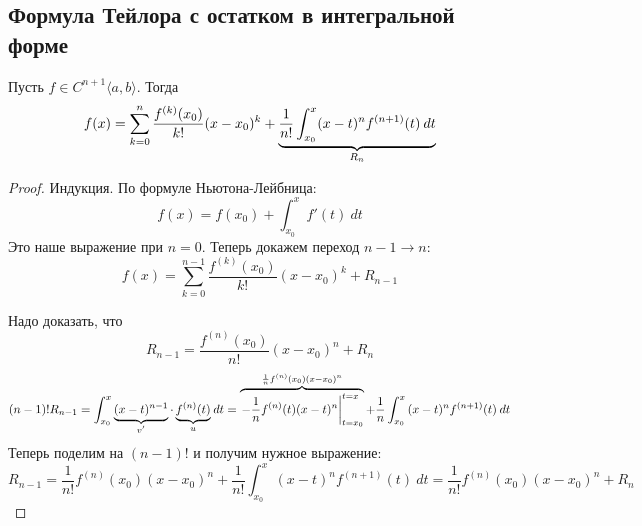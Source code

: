 \subsection{Формула Тейлора с остатком в интегральной форме}

\begin{theorem}
    Пусть $f \in C^{n + 1}\langle a, b \rangle$. Тогда
    \begin{equation*}
    f(x) =
    \sum_{k = 0}^{n} \frac{f^{(k)}(x_0)}{k!}(x - x_0)^k +
    \underbrace{\frac{1}{n!}\int_{x_0}^{x} (x - t)^n f^{(n + 1)}(t) \: dt}_{\mathclap{R_n}}
    \end{equation*}
\end{theorem}
\begin{proof}
    Индукция. По формуле Ньютона-Лейбница:
    \begin{equation*}
      f(x) = f(x_0) + \int_{x_0}^{x} f'(t) \: dt
    \end{equation*}
    Это наше выражение при $n = 0$. Теперь докажем переход $n - 1 \to n$:
    \begin{equation*}
      f(x) = \sum_{k = 0}^{n - 1} \frac{f^{(k)}(x_0)}{k!}(x - x_0)^{k} + R_{n - 1}
    \end{equation*}

    Надо доказать, что
    \begin{equation*}
      R_{n - 1} = \frac{f^{(n)}(x_0)}{n!}(x - x_0)^n + R_n
    \end{equation*}
    \begin{equation*}
      (n - 1)!R_{n - 1} =
      \int_{{x_0}}^{{x}} {\underbrace{(x - t)^{n - 1}}_{\mathclap{v'}}\cdot \underbrace{f^{(n)}(t)}_{\mathclap{u}}} \: d{t} =
      \overbrace{\left.-\frac{1}{n}f^{(n)}(t)(x - t)^n\right|_{t = x_0}^{t = x}}^{\mathclap{\frac{1}{n}f^{(n)}(x_0)(x - x_0)^n}}
      + \frac{1}{n} \int_{{x_0}}^{{x}} {(x - t)^n f^{(n + 1)}(t)} \: d{t}
    \end{equation*}
    Теперь поделим на $(n - 1)!$ и получим нужное выражение:
    \begin{equation*}
      R_{n - 1} =
      \frac{1}{n!}f^{(n)}(x_0)(x - x_0)^{n} +
      \frac{1}{n!} \int_{{x_0}}^{{x}} {(x - t)^n f^{(n + 1)}(t)} \: d{t}
      =
      \frac{1}{n!}f^{(n)}(x_0)(x - x_0)^{n} +
      R_n
    \end{equation*}
\end{proof}